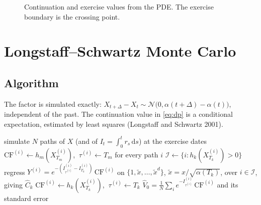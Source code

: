 \documentclass[11pt,a4paper]{article}
\theoremstyle{definition}
\theoremstyle{remark}
\newcommand{\N}{\mathcal{N}}
\newcommand{\dd}{\,\mathrm{d}}
\begin{document}
\begin{figure}[ht]\centering
{}\hfill
{}
\caption{Continuation and exercise values from the PDE. The exercise boundary is the crossing point.}\label{fig:boundary}
\end{figure}

\section{Longstaff--Schwartz Monte Carlo}\label{sec:lsmc}
\subsection{Algorithm}
The factor is simulated exactly: $X_{t+\Delta}-X_t\sim\N\big(0,\alpha(t+\Delta)-\alpha(t)\big)$, independent of the past. The
continuation value in \eqref{eq:dp} is a conditional expectation, estimated by least squares (Longstaff and Schwartz 2001).

\begin{algorithm}[ht]\caption{Longstaff--Schwartz for the Bermudan swaption}\label{alg:lsmc}
\begin{algorithmic}[1]
\State simulate $N$ paths of $X$ (and of $I_t=\int_0^tr_s\dd s$) at the exercise dates
\State $\mathrm{CF}^{(i)}\gets h_m(X^{(i)}_{T_m})$, $\ \tau^{(i)}\gets T_m$ for every path $i$
  \State $\mathcal I\gets\{i: h_k(X^{(i)}_{T_k})>0\}$ 
  \State regress $Y^{(i)}=e^{-(I^{(i)}_{\tau^{(i)}}-I^{(i)}_{T_k})}\,\mathrm{CF}^{(i)}$ on $\{1,\tilde x,\dots,\tilde x^d\}$,
        $\tilde x=x/\sqrt{\alpha(T_k)}$, over $i\in\mathcal I$, giving $\hat C_k$
     \State $\mathrm{CF}^{(i)}\gets h_k(X^{(i)}_{T_k})$, $\ \tau^{(i)}\gets T_k$
  \EndFor
\EndFor
\State \Return $\hat V_0=\frac1N\sum_ie^{-I^{(i)}_{\tau^{(i)}}}\,\mathrm{CF}^{(i)}$ and its standard error
\end{algorithmic}
\end{algorithm}
\end{document}
